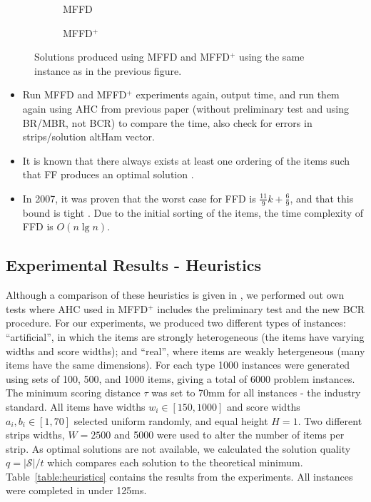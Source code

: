 \documentclass{elsarticle}
\begin{document}
\begin{figure}[H]	
	\centering
	\begin{subfigure}[h]{0.45\textwidth}
		
		\caption{MFFD}
		\label{fig:mffd}
	\end{subfigure} \hspace{10mm}
	\begin{subfigure}[h]{0.45\textwidth}
		
		\caption{MFFD$^+$}
		\label{fig:mffdplus}
	\end{subfigure}
	\caption{Solutions produced using MFFD and MFFD$^+$ using the same instance as in the previous figure. }
	\label{fig:mffdvsmffdplus}
\end{figure}

{\color{myPink}
\begin{itemize}[leftmargin=*]
	\item Run MFFD and MFFD$^+$ experiments again, output time, and run them again using AHC from previous paper (without preliminary test and using BR/MBR, not BCR) to compare the time, also check for errors in strips/solution altHam vector.
	\item It is known that there always exists at least one ordering of the items such that FF produces an optimal solution \cite{lewis2009}.
	\item In 2007, it was proven that the worst case for FFD is $\frac{11}{9}k + \frac{6}{9}$, and that this bound is tight \cite{dosa2007}. Due to the initial sorting of the items, the time complexity of FFD is $O(n \lg n)$.
\end{itemize}
}

\subsection{Experimental Results - Heuristics}
\label{sub:expheuristics}
\noindent Although a comparison of these heuristics is given in \cite{hawa2018}, we performed out own tests where AHC used in MFFD$^+$ includes the preliminary test and the new BCR procedure. For our experiments, we produced two different types of instances: ``artificial'', in which the items are strongly heterogeneous (the items have varying widths and score widths); and ``real'', where items are weakly hetergeneous (many items have the same dimensions). For each type 1000 instances were generated using sets of 100, 500, and 1000 items, giving a total of 6000 problem instances. The minimum scoring distance $\tau$ was set to 70mm for all instances - the industry standard. All items have widths $w_i \in [150,1000]$ and score widths $a_i, b_i \in [1,70]$ selected uniform randomly, and equal height $H=1$. Two different strips widths, $W = 2500$ and 5000 were used to alter the number of items per strip. As optimal solutions are not available, we calculated the solution quality $q = |\mathcal{S}|/ t$ which compares each solution to the theoretical minimum. Table~\ref{table:heuristics} contains the results from the experiments. All instances were completed in under 125ms.
\end{document}
